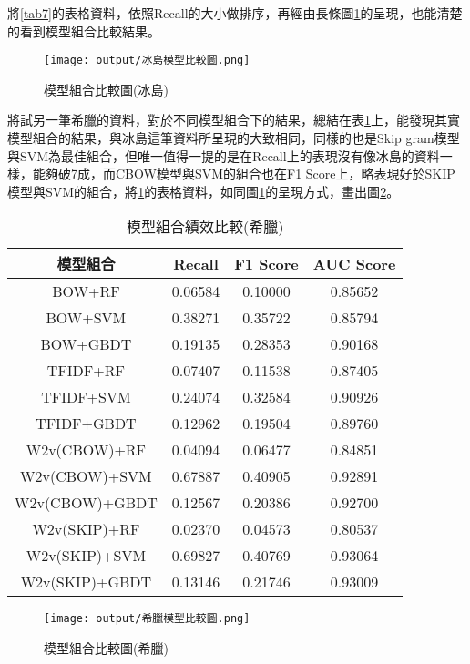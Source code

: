 	將\ref{tab7}的表格資料，依照Recall的大小做排序，再經由長條圖\ref{Fig6}的呈現，也能清楚的看到模型組合比較結果。
	
	\begin{figure}[H]
	\centering
	\texttt{[image: output/冰島模型比較圖.png]}
	\caption{模型組合比較圖(冰島)}
	\label{Fig6}
	\end{figure}
	
	
	將試另一筆希臘的資料，對於不同模型組合下的結果，總結在表\ref{tab8}上，能發現其實模型組合的結果，與冰島這筆資料所呈現的大致相同，同樣的也是Skip gram模型與SVM為最佳組合，但唯一值得一提的是在Recall上的表現沒有像冰島的資料一樣，能夠破7成，而CBOW模型與SVM的組合也在F1 Score上，略表現好於SKIP模型與SVM的組合，將\ref{tab8}的表格資料，如同圖\ref{Fig6}的呈現方式，畫出圖\ref{Fig7}。
	
	\begin{table}[H]
	\centering
	\caption{模型組合績效比較(希臘)}
	\begin{tabular}{|c|ccc|}
	\toprule
	模型組合 & Recall & F1 Score & AUC Score \\
	\midrule
	BOW+RF & 0.06584 & 0.10000 & 0.85652  \\
	\midrule
	BOW+SVM & 0.38271 & 0.35722 & 0.85794 \\
	\midrule
	BOW+GBDT & 0.19135 & 0.28353 & 0.90168 \\
	\midrule
	TFIDF+RF & 0.07407 & 0.11538 & 0.87405  \\
	\midrule
	TFIDF+SVM & 0.24074 & 0.32584 & 0.90926  \\
	\midrule
	TFIDF+GBDT & 0.12962 & 0.19504 & 0.89760 \\
	\midrule
	W2v(CBOW)+RF & 0.04094 & 0.06477 & 0.84851 \\
	\midrule
	W2v(CBOW)+SVM & 0.67887 & 0.40905 & 0.92891 \\
	\midrule
	W2v(CBOW)+GBDT & 0.12567 & 0.20386 & 0.92700 \\
	\midrule
	W2v(SKIP)+RF & 0.02370 & 0.04573 & 0.80537 \\
	\midrule
	W2v(SKIP)+SVM & 0.69827 & 0.40769 & 0.93064  \\
	\midrule
	W2v(SKIP)+GBDT & 0.13146 & 0.21746 & 0.93009  \\
	\bottomrule
	\end{tabular}
	\label{tab8}
	\end{table}
	
	\begin{figure}[H]
	\centering
	\texttt{[image: output/希臘模型比較圖.png]}
	\caption{模型組合比較圖(希臘)}
	\label{Fig7}
	\end{figure}
	
